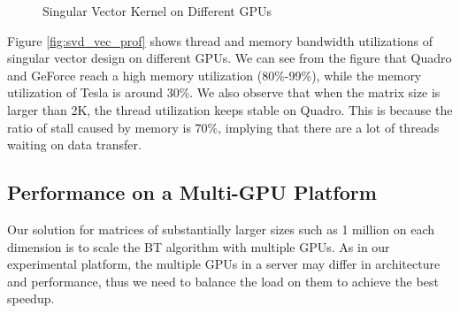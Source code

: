 \begin{figure}[hbpt]
\vspace{-0.3in}
\centering
\vspace{-0.1in}
  \caption{Singular Vector Kernel on Different GPUs}
  \label{fig:svdvec}
\vspace{-0.3in}
\end{figure}

Figure \ref{fig:svd_vec_prof} shows thread and memory bandwidth utilizations of singular vector design on different GPUs. 
We can see from the figure that Quadro and GeForce reach a high memory utilization (80\%-99\%), while the memory utilization of Tesla is around 30\%. 
We also observe that when the matrix size is larger than 2K, the thread utilization keeps stable on Quadro. 
This is because the ratio of stall caused by memory is 70\%, implying that there are a lot of threads waiting on data transfer.


\subsection{Performance on a Multi-GPU Platform}

Our solution for matrices of substantially larger sizes such
as 1 million on each dimension is to scale the BT algorithm
with multiple GPUs.
As in our experimental platform, the multiple GPUs in a server may differ
in architecture and performance, thus we need to balance the load on them
to achieve the best speedup.

